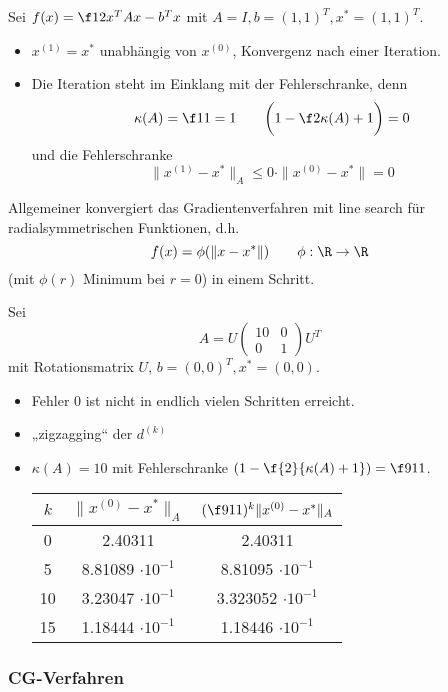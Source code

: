\documentclass[11pt]{scrartcl}
\begin{document}
\begin{ex*}
	Sei $f(x) = \f 12 x^T A x - b^Tx$ mit $A = I, b = (1,1)^T, x^* = (1,1)^T$.
	\begin{itemize}
		\item
			$x^{(1)} = x^*$ unabhängig von $x^{(0)}$, Konvergenz nach einer Iteration.
		\item
			Die Iteration steht im Einklang mit der Fehlerschranke, denn
			\[
				\kappa(A) = \f 11 = 1
				\qquad
				\bigg( 1 - \f 2{\kappa(A) + 1}\bigg) = 0
			\]
			und die Fehlerschranke
			\[
				\|x^{(1)} - x^*\|_A \le 0 \cdot \|x^{(0)} - x^*\| = 0
			\]
	\end{itemize}
	Allgemeiner konvergiert das Gradientenverfahren mit line search für radialsymmetrischen Funktionen, d.h.
	\[
		f(x) = \phi(\|x-x^*\|)
		\qquad \phi : \R \to \R
	\]
	(mit $\phi(r)$ Minimum bei $r=0$) in einem Schritt.
\end{ex*}

\begin{ex*}
	Sei
	\[
		A = U \begin{pmatrix}
			10 & 0 \\
			0 & 1
		\end{pmatrix} U^T
	\]
	mit Rotationsmatrix $U$, $b = (0,0)^T, x^* = (0,0)$.
	\begin{itemize}
		\item
			Fehler $0$ ist nicht in endlich vielen Schritten erreicht.
		\item
			„zigzagging“ der $d^{(k)}$
		\item
			$\kappa(A) = 10$ mit Fehlerschranke $(1- \f {2}{\kappa(A)+1}) = \f 9{11}$.
			\begin{table}[h]
				\centering
				\begin{tabular}{c|c|c}
					$k$ & $\|x^{(0)} - x^*\|_A$ & $(\f 9{11})^k \|x^{(0)} - x^*\|_A$ \\ \hline
					0 & 2.40311 & 2.40311 \\
					5 & 8.81089 $\cdot 10^{-1}$ & 8.81095 $\cdot 10^{-1}$ \\
					10 & 3.23047 $\cdot 10^{-1}$ & 3.323052 $\cdot 10^{-1}$ \\
					15 & 1.18444 $\cdot 10^{-1} $& 1.18446 $\cdot 10^{-1}$
				\end{tabular}
			\end{table}
	\end{itemize}
\end{ex*}


\subsubsection{CG-Verfahren}
\end{document}

